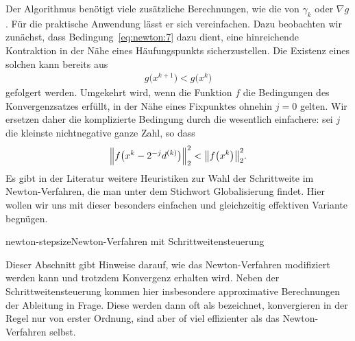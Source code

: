 \begin{remark}
  Der Algorithmus benötigt viele zusätzliche Berechnungen, wie die von
  $\gamma_k$ oder $\nabla g$. Für die praktische Anwendung lässt er
  sich vereinfachen. Dazu beobachten wir zunächst, dass
  Bedingung~\eqref{eq:newton:7} dazu dient, eine hinreichende
  Kontraktion in der Nähe eines Häufungspunkts sicherzustellen. Die
  Existenz eines solchen kann bereits aus
  \begin{gather}
    g\bigl(x^{k+1}\bigr) < g\bigl(x^{k}\bigr)
  \end{gather}
  gefolgert werden. Umgekehrt wird, wenn die Funktion $f$ die
  Bedingungen des Konvergenzsatzes 
  erfüllt, in der Nähe eines Fixpunktes ohnehin $j=0$ gelten. Wir
  ersetzen daher die komplizierte Bedingung durch die wesentlich
  einfachere: sei $j$ die kleinste nichtnegative ganze Zahl, so dass
  \begin{gather}
    \norm*{f\bigl(x^{k} - 2^{-j} d^{(k)}\bigr)}_2^2 < \norm*{f\bigl(x^{k}\bigr)}_2^2.
  \end{gather}
  Es gibt in der Literatur weitere Heuristiken zur Wahl der
  Schrittweite im Newton-Verfahren, die man unter dem Stichwort \glqq
  Globalisierung\grqq{} findet. Hier wollen wir uns mit dieser
  besonders einfachen und gleichzeitig effektiven Variante begnügen.
\end{remark}

\begin{Algorithmus*}{newton-stepsize}{Newton-Verfahren mit Schrittweitensteuerung}
    
\end{Algorithmus*}

\begin{remark}
  Dieser Abschnitt gibt Hinweise darauf, wie das Newton-Verfahren
  modifiziert werden kann und trotzdem Konvergenz erhalten wird. Neben
  der Schrittweitensteuerung kommen hier insbesondere approximative
  Berechnungen der Ableitung in Frage. Diese werden dann oft als
   bezeichnet, konvergieren in der
  Regel nur von erster Ordnung, sind aber of viel effizienter als das
  Newton-Verfahren selbst.
\end{remark}


